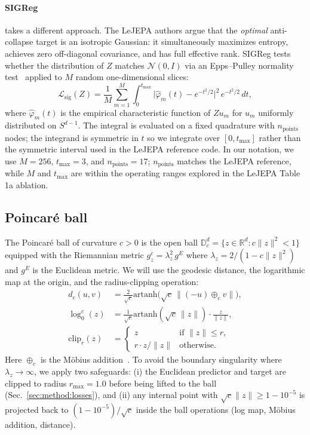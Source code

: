 \documentclass{article}
\begin{document}
\paragraph{SIGReg \citep{ball2025lejepa}} takes a different approach. The LeJEPA authors argue that the \emph{optimal} anti-collapse target is an isotropic Gaussian: it simultaneously maximizes entropy, achieves zero off-diagonal covariance, and has full effective rank. SIGReg tests whether the distribution of $Z$ matches $\mathcal{N}(0, I)$ via an Epps--Pulley normality test~\citep{epps1983normality} applied to $M$ random one-dimensional slices:
\begin{equation}
  \mathcal{L}_{\text{sig}}(Z) = \frac{1}{M} \sum_{m=1}^M \int_0^{t_{\max}} \bigl| \hat\varphi_m(t) - e^{-t^2/2} \bigr|^2\, e^{-t^2/2}\, dt,
\end{equation}
where $\hat\varphi_m(t)$ is the empirical characteristic function of $Z u_m$ for $u_m$ uniformly distributed on $S^{d-1}$. The integral is evaluated on a fixed quadrature with $n_{\text{points}}$ nodes; the integrand is symmetric in $t$ so we integrate over $[0, t_{\max}]$ rather than the symmetric interval used in the LeJEPA reference code. In our notation, we use $M{=}256$, $t_{\max}{=}3$, and $n_{\text{points}}{=}17$; $n_{\text{points}}$ matches the LeJEPA reference, while $M$ and $t_{\max}$ are within the operating ranges explored in the LeJEPA Table 1a ablation.

\subsection{Poincar\'{e} ball}
\label{sec:background:poincare}

The Poincar\'{e} ball of curvature $c > 0$ is the open ball $\mathbb{D}^d_c = \{z \in \mathbb{R}^d : c\|z\|^2 < 1\}$ equipped with the Riemannian metric $g^c_z = \lambda_z^2\, g^E$ where $\lambda_z = 2 / (1 - c\|z\|^2)$ and $g^E$ is the Euclidean metric. We will use the geodesic distance, the logarithmic map at the origin, and the radius-clipping operation:
\begin{align}
  d_c(u, v) &= \frac{2}{\sqrt{c}} \mathrm{artanh}\bigl(\sqrt{c}\, \|(-u) \oplus_c v\|\bigr), \label{eq:poincare-dist}\\
  \log^c_0(z) &= \frac{1}{\sqrt{c}} \mathrm{artanh}(\sqrt{c}\,\|z\|) \cdot \frac{z}{\|z\|}, \label{eq:logmap}\\
  \mathrm{clip}_r(z) &= \begin{cases} z & \text{if } \|z\| \le r,\\ r \cdot z/\|z\| & \text{otherwise.}\end{cases} \label{eq:clip}
\end{align}
Here $\oplus_c$ is the M\"obius addition~\citep{ganea2018hyperbolic}. To avoid the boundary singularity where $\lambda_z \to \infty$, we apply two safeguards: (i) the Euclidean predictor and target are clipped to radius $r_{\max} = 1.0$ before being lifted to the ball (Sec.~\ref{sec:method:losses}), and (ii) any internal point with $\sqrt{c}\|z\| \ge 1 - 10^{-5}$ is projected back to $(1 - 10^{-5})/\sqrt{c}$ inside the ball operations (log map, M\"obius addition, distance).
\end{document}
